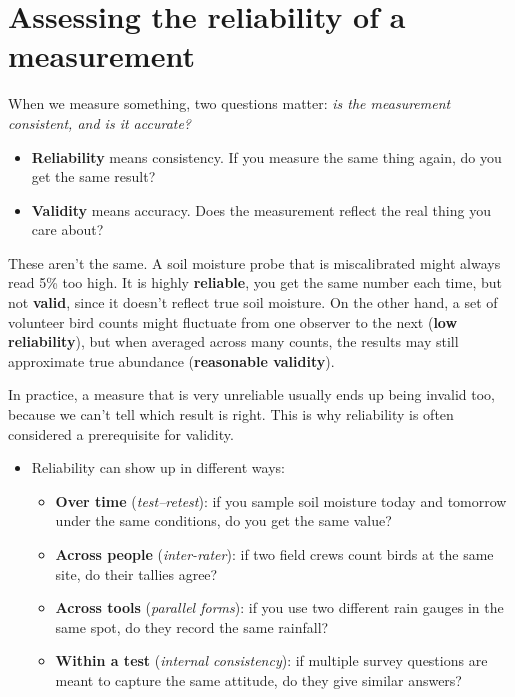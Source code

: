 \documentclass[
  letterpaper,
  DIV=11,
  numbers=noendperiod]{scrreprt}
\begin{document}
\section{Assessing the reliability of a
measurement}\label{assessing-the-reliability-of-a-measurement}

When we measure something, two questions matter: \emph{is the
measurement consistent, and is it accurate?}

\begin{itemize}
\item
  \textbf{Reliability} means consistency. If you measure the same thing
  again, do you get the same result?
\item
  \textbf{Validity} means accuracy. Does the measurement reflect the
  real thing you care about?
\end{itemize}

These aren't the same. A soil moisture probe that is miscalibrated might
always read 5\% too high. It is highly \textbf{reliable}, you get the
same number each time, but not \textbf{valid}, since it doesn't reflect
true soil moisture. On the other hand, a set of volunteer bird counts
might fluctuate from one observer to the next (\textbf{low
reliability}), but when averaged across many counts, the results may
still approximate true abundance (\textbf{reasonable validity}).

In practice, a measure that is very unreliable usually ends up being
invalid too, because we can't tell which result is right. This is why
reliability is often considered a prerequisite for validity.

\begin{itemize}
\item
  Reliability can show up in different ways:

  \begin{itemize}
  \item
    \textbf{Over time} (\emph{test--retest}): if you sample soil
    moisture today and tomorrow under the same conditions, do you get
    the same value?
  \item
    \textbf{Across people} (\emph{inter-rater}): if two field crews
    count birds at the same site, do their tallies agree?
  \item
    \textbf{Across tools} (\emph{parallel forms}): if you use two
    different rain gauges in the same spot, do they record the same
    rainfall?
  \item
    \textbf{Within a test} (\emph{internal consistency}): if multiple
    survey questions are meant to capture the same attitude, do they
    give similar answers?
  \end{itemize}
\end{itemize}
\end{document}
